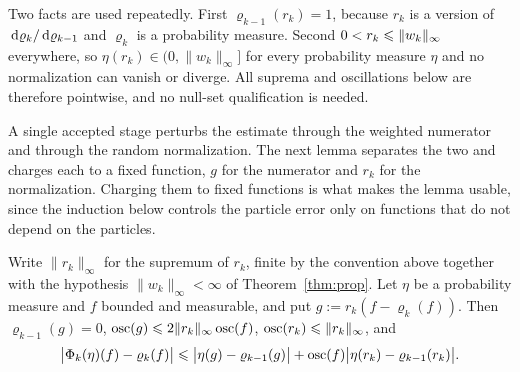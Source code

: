 \documentclass{article}
\begin{document}
\noindent
Two facts are used repeatedly. First $\varrho_{k-1}(r_k)=1$, because $r_k$ is a version of $\,\mathrm d\varrho_k/\,\mathrm d\varrho_{k-1}$ and $\varrho_k$ is a probability measure. Second $0<r_k\leqslant\lVert w_k\rVert_\infty$ everywhere, so $\eta(r_k)\in(0,\lVert w_k\rVert_\infty]$ for every probability measure $\eta$ and no normalization can vanish or diverge. All suprema and oscillations below are therefore pointwise, and no null-set qualification is needed.

\medskip\noindent
A single accepted stage perturbs the estimate through the weighted numerator and through the random normalization. The next lemma separates the two and charges each to a fixed function, $g$ for the numerator and $r_k$ for the normalization. Charging them to fixed functions is what makes the lemma usable, since the induction below controls the particle error only on functions that do not depend on the particles.

\begin{lemma}
\label{lem:onestep}
Write $\lVert r_k\rVert_\infty$ for the supremum of $r_k$, finite by the convention above together with the hypothesis $\lVert w_k\rVert_\infty<\infty$ of Theorem~\ref{thm:prop}. Let $\eta$ be a probability measure and $f$ bounded and measurable, and put $g := r_k(f-\varrho_k(f))$. Then $\varrho_{k-1}(g)=0$, $\operatorname{osc}(g)\leqslant 2\lVert r_k\rVert_\infty\operatorname{osc}(f)$, $\operatorname{osc}(r_k)\leqslant\lVert r_k\rVert_\infty$, and
\begin{equation*}
    \bigl|\Phi_k(\eta)(f)-\varrho_k(f)\bigr| \leqslant \bigl|\eta(g)-\varrho_{k-1}(g)\bigr| + \operatorname{osc}(f)\bigl|\eta(r_k)-\varrho_{k-1}(r_k)\bigr|.
\end{equation*}
\end{lemma}
\end{document}

